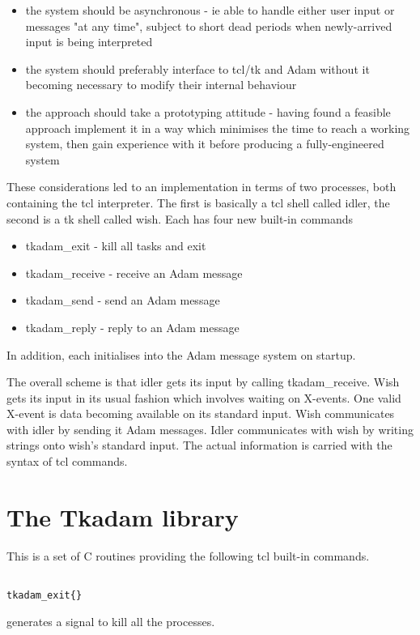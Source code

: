 \begin{itemize}
\item the system should be asynchronous - ie able to handle either user
input or messages "at any time", subject to short dead periods when
newly-arrived input is being interpreted
\item the system should preferably interface to tcl/tk and Adam without
it becoming necessary to modify their internal behaviour
\item the approach should take a prototyping attitude - having found a
feasible approach implement it in a way which minimises the time to reach
a working system, then gain experience with it before producing a
fully-engineered system
\end{itemize}

These considerations led to an implementation in terms of two processes,
both containing the tcl interpreter. The first is basically a tcl shell
called idler, the second is a tk shell called wish. Each has four new
built-in commands

\begin{itemize}
\item tkadam\_exit - kill all tasks and exit
\item tkadam\_receive - receive an Adam message
\item tkadam\_send - send an Adam message
\item tkadam\_reply - reply to an Adam message
\end{itemize}

In addition, each initialises into the Adam message system on startup.

The overall scheme is that idler gets its input by calling
tkadam\_receive. Wish gets its input in its usual fashion which involves
waiting on X-events. One valid X-event is data becoming available on its
standard input. Wish communicates with idler by sending it Adam messages.
Idler communicates with wish by writing strings onto wish's standard input.
The actual information is carried with the syntax of tcl commands.

\section {The Tkadam library}

This is a set of C routines providing the following tcl built-in commands.

\begin{verbatim}

tkadam_exit{}

\end{verbatim}
generates a signal to kill all the processes.

